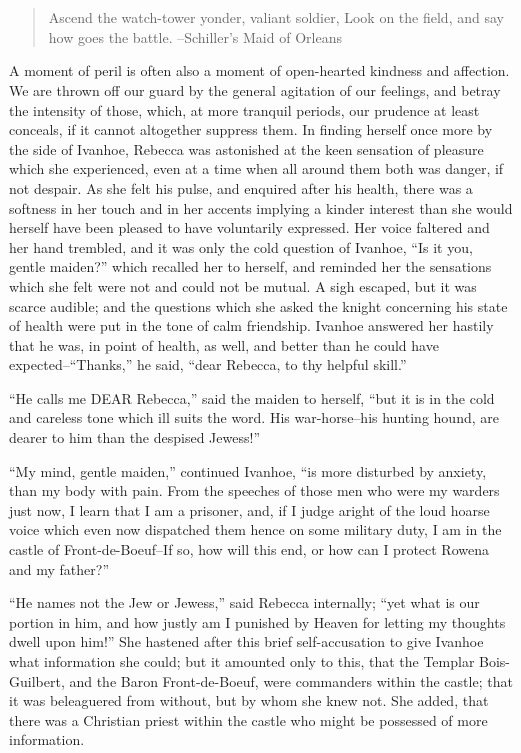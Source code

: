 \chapter{}

\begin{quote}
Ascend the watch-tower yonder, valiant soldier,
Look on the field, and say how goes the battle.
--Schiller's Maid of Orleans
\end{quote}

A moment of peril is often also a moment of open-hearted kindness and
affection. We are thrown off our guard by the general agitation of our
feelings, and betray the intensity of those, which, at more tranquil
periods, our prudence at least conceals, if it cannot altogether
suppress them. In finding herself once more by the side of Ivanhoe,
Rebecca was astonished at the keen sensation of pleasure which she
experienced, even at a time when all around them both was danger, if not
despair. As she felt his pulse, and enquired after his health, there was
a softness in her touch and in her accents implying a kinder interest
than she would herself have been pleased to have voluntarily expressed.
Her voice faltered and her hand trembled, and it was only the cold
question of Ivanhoe, ``Is it you, gentle maiden?'' which recalled her to
herself, and reminded her the sensations which she felt were not and
could not be mutual. A sigh escaped, but it was scarce audible; and the
questions which she asked the knight concerning his state of health were
put in the tone of calm friendship. Ivanhoe answered her hastily that he
was, in point of health, as well, and better than he could have
expected--``Thanks,'' he said, ``dear Rebecca, to thy helpful skill.''

``He calls me DEAR Rebecca,'' said the maiden to herself, ``but it is in
the cold and careless tone which ill suits the word. His war-horse--his
hunting hound, are dearer to him than the despised Jewess!''

``My mind, gentle maiden,'' continued Ivanhoe, ``is more disturbed by
anxiety, than my body with pain. From the speeches of those men who were
my warders just now, I learn that I am a prisoner, and, if I judge
aright of the loud hoarse voice which even now dispatched them hence on
some military duty, I am in the castle of Front-de-Boeuf--If so, how
will this end, or how can I protect Rowena and my father?''

``He names not the Jew or Jewess,'' said Rebecca internally; ``yet what
is our portion in him, and how justly am I punished by Heaven for
letting my thoughts dwell upon him!'' She hastened after this brief
self-accusation to give Ivanhoe what information she could; but it
amounted only to this, that the Templar Bois-Guilbert, and the Baron
Front-de-Boeuf, were commanders within the castle; that it was
beleaguered from without, but by whom she knew not. She added, that
there was a Christian priest within the castle who might be possessed of
more information.

